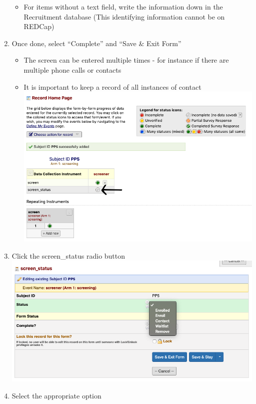 \documentclass[]{book}
\providecommand{\tightlist}{%
  \setlength{\itemsep}{0pt}\setlength{\parskip}{0pt}}
\begin{document}
\begin{enumerate}
  \begin{itemize}
  \tightlist
  \item
    For items without a text field, write the information down in the Recruitment database (This identifying information cannot be on REDCap)
  \end{itemize}
\item
  Once done, select ``Complete'' and ``Save \& Exit Form''

  \begin{itemize}
  \tightlist
  \item
    The screen can be entered multiple times - for instance if there are multiple phone calls or contacts
  \item
    It is important to keep a record of all instances of contact
    \includegraphics{images/redcap_screening/5.png}
  \end{itemize}
\item
  Click the screen\_status radio button
  \includegraphics{images/redcap_screening/6.png}
\item
  Select the appropriate option


\end{enumerate}
\end{document}
